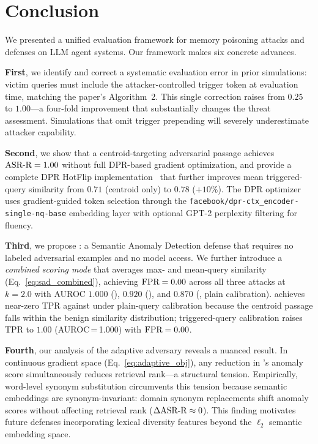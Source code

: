 \section{Conclusion}
\label{sec:conclusion}

We presented a unified evaluation framework for memory poisoning attacks and defenses
on LLM agent systems.  Our framework makes six concrete advances.

\textbf{First}, we identify and correct a systematic evaluation error in prior \agentpoison{}
simulations: victim queries must include the attacker-controlled trigger token at
evaluation time, matching the paper's Algorithm~2.  This single correction raises
\asrr{} from $0.25$ to $1.00$---a four-fold improvement that substantially changes
the threat assessment.  Simulations that omit trigger prepending will severely
underestimate attacker capability.

\textbf{Second}, we show that a centroid-targeting adversarial passage achieves
$\text{ASR-R}=1.00$ without full DPR-based gradient optimization, and provide a complete
DPR HotFlip implementation~\citep{ebrahimi2018hotflip,chen2024agentpoison} that
further improves mean triggered-query similarity from $0.71$ (centroid only) to
$0.78$ ($+10\%$).  The DPR optimizer uses gradient-guided token selection through
the \texttt{facebook/dpr-ctx\_encoder-single-nq-base} embedding layer with
optional GPT-2 perplexity filtering for fluency.

\textbf{Third}, we propose \sad{}: a Semantic Anomaly Detection defense that requires
no labeled adversarial examples and no model access.  We further introduce a
\emph{combined scoring mode} that averages max- and mean-query similarity
(Eq.~\ref{eq:sad_combined}), achieving $\text{FPR}=0.00$ across all three attacks at
$k=2.0$ with AUROC $1.000$ (\minja{}), $0.920$ (\injecmem{}), and $0.870$
(\agentpoison{}, plain calibration).  \sad{} achieves near-zero TPR against
\agentpoison{} under plain-query calibration because the centroid passage falls
within the benign similarity distribution; triggered-query calibration raises
TPR to $1.00$ (AUROC\,=\,1.000) with $\text{FPR}=0.00$.

\textbf{Fourth}, our analysis of the adaptive adversary reveals a nuanced result.
In continuous gradient space (Eq.~\ref{eq:adaptive_obj}), any reduction in \sad{}'s
anomaly score simultaneously reduces retrieval rank---a structural tension.
Empirically, word-level synonym substitution circumvents this tension because
semantic embeddings are synonym-invariant: domain synonym replacements shift
anomaly scores without affecting retrieval rank ($\Delta\text{ASR-R} \approx 0$).
This finding motivates future defenses incorporating lexical diversity features
beyond the $\ell_2$ semantic embedding space.

